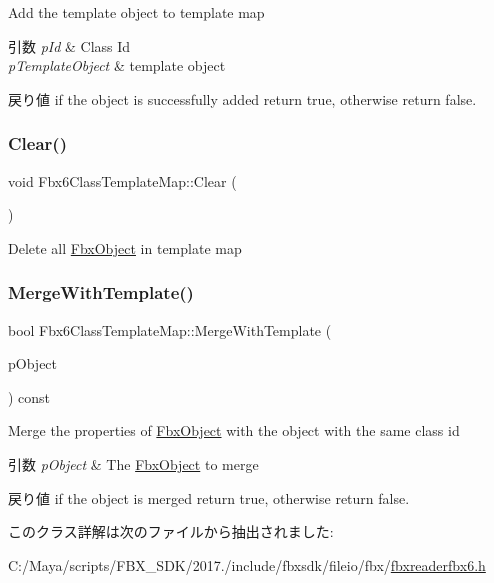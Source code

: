 Add the template object to template map 
\begin{DoxyParams}{引数}
{\em p\+Id} & Class Id \\
\hline
{\em p\+Template\+Object} & template object \\
\hline
\end{DoxyParams}
\begin{DoxyReturn}{戻り値}
if the object is successfully added return {\ttfamily true}, otherwise return {\ttfamily false}. 
\end{DoxyReturn}
\mbox{\label{class_fbx6_class_template_map_a522d86033875290b78d0034909997fde}} 
\subsubsection{\texorpdfstring{Clear()}{Clear()}}
{\footnotesize\ttfamily void Fbx6\+Class\+Template\+Map\+::\+Clear (\begin{DoxyParamCaption}{ }\end{DoxyParamCaption})}

Delete all \hyperlink{class_fbx_object}{Fbx\+Object} in template map \mbox{\label{class_fbx6_class_template_map_a93b436ce1ce8f65302b675cb3a085134}} 
\subsubsection{\texorpdfstring{Merge\+With\+Template()}{MergeWithTemplate()}}
{\footnotesize\ttfamily bool Fbx6\+Class\+Template\+Map\+::\+Merge\+With\+Template (\begin{DoxyParamCaption}\item[{\hyperlink{class_fbx_object}{Fbx\+Object} $\ast$}]{p\+Object }\end{DoxyParamCaption}) const}

Merge the properties of \hyperlink{class_fbx_object}{Fbx\+Object} with the object with the same class id 
\begin{DoxyParams}{引数}
{\em p\+Object} & The \hyperlink{class_fbx_object}{Fbx\+Object} to merge \\
\hline
\end{DoxyParams}
\begin{DoxyReturn}{戻り値}
if the object is merged return {\ttfamily true}, otherwise return {\ttfamily false}. 
\end{DoxyReturn}


このクラス詳解は次のファイルから抽出されました\+:\begin{DoxyCompactItemize}
\item 
C\+:/\+Maya/scripts/\+F\+B\+X\+\_\+\+S\+D\+K/2017./include/fbxsdk/fileio/fbx/\hyperlink{fbxreaderfbx6_8h}{fbxreaderfbx6.\+h}\end{DoxyCompactItemize}

